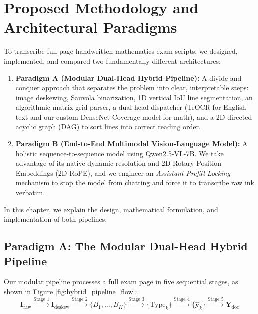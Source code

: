 \chapter{Proposed Methodology and Architectural Paradigms}
\label{ch:methodology}

To transcribe full-page handwritten mathematics exam scripts, we designed, implemented, and compared two fundamentally different architectures:
\begin{enumerate}
    \item \textbf{Paradigm A (Modular Dual-Head Hybrid Pipeline):} A divide-and-conquer approach that separates the problem into clear, interpretable steps: image deskewing, Sauvola binarization, 1D vertical IoU line segmentation, an algorithmic matrix grid parser, a dual-head dispatcher (TrOCR for English text and our custom DenseNet-Coverage model for math), and a 2D directed acyclic graph (DAG) to sort lines into correct reading order.
    \item \textbf{Paradigm B (End-to-End Multimodal Vision-Language Model):} A holistic sequence-to-sequence model using Qwen2.5-VL-7B. We take advantage of its native dynamic resolution and 2D Rotary Position Embeddings (2D-RoPE), and we engineer an \emph{Assistant Prefill Locking} mechanism to stop the model from chatting and force it to transcribe raw ink verbatim.
\end{enumerate}

In this chapter, we explain the design, mathematical formulation, and implementation of both pipelines.

\section{Paradigm A: The Modular Dual-Head Hybrid Pipeline}
\label{sec:paradigm_a_overview}

Our modular pipeline processes a full exam page in five sequential stages, as shown in Figure \ref{fig:hybrid_pipeline_flow}:
\begin{equation}
\mathbf{I}_{\text{raw}} \xrightarrow{\text{Stage 1}} \mathbf{I}_{\text{deskew}} \xrightarrow{\text{Stage 2}} \{B_1, \dots, B_K\} \xrightarrow{\text{Stage 3}} \{\text{Type}_k\} \xrightarrow{\text{Stage 4}} \{\hat{\mathbf{y}}_k\} \xrightarrow{\text{Stage 5}} \mathbf{Y}_{\text{doc}}
\end{equation}


